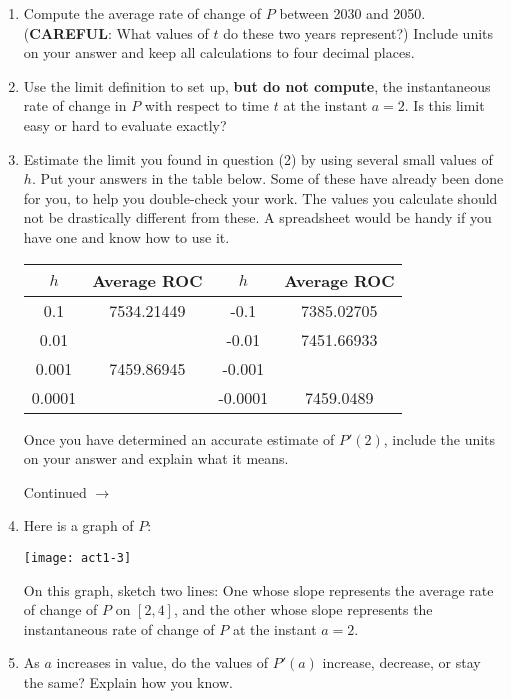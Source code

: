 \documentclass[11pt]{article}
\def\ra{\rightarrow}
\def\pageturn{\vfill 
\begin{flushright}
	\begin{small}
		Continued $\ra$
	\end{small}
\end{flushright} \newpage}
\begin{document}
\begin{enumerate}
	\item Compute the average rate of change of $P$ between 2030 and 2050. (\textbf{CAREFUL}: What values of $t$ do these two years represent?) Include units on your answer and keep all calculations to four decimal places. 
	
	\vspace{1in}
	
	\item Use the limit definition to set up, \textbf{but do not compute}, the instantaneous rate of change in $P$ with respect to time $t$ at the instant $a = 2$. Is this limit easy or hard to evaluate exactly? 
	
	\vspace{2in}
	
	\item Estimate the limit you found in question (2) by using several small values of $h$. Put your answers in the table below. Some of these have already been done for you, to help you double-check your work.  The values you calculate should not be drastically different from these. A spreadsheet would be handy if you have one and know how to use it. 
	
	\begin{center}
		\begin{tabular}{c|c||c|c}
		$h$ & Average ROC & $h$ & Average ROC \\ \hline
		0.1 & 7534.21449   & -0.1 & 7385.02705   \\
		0.01 &    & -0.01 & 7451.66933   \\
		0.001 & 7459.86945   & -0.001 &    \\
		0.0001 &    & -0.0001 &  7459.0489  \\
		\end{tabular}
	\end{center}
	Once you have determined an accurate estimate of $P'(2)$, include the units on your answer and explain what it means.
	
	\pageturn
	
	\item Here is a graph of $P$: 
	\begin{center}
		\texttt{[image: act1-3]}
	\end{center}
	
	On this graph, sketch two lines: One whose slope represents the average rate of change of $P$ on $[2,4]$, and the other whose slope represents the instantaneous rate of change of $P$ at the instant $a = 2$. 
	
	\item As $a$ increases in value, do the values of $P'(a)$ increase, decrease, or stay the same? Explain how you know. 
	
	
	
\end{enumerate}
\end{document}
